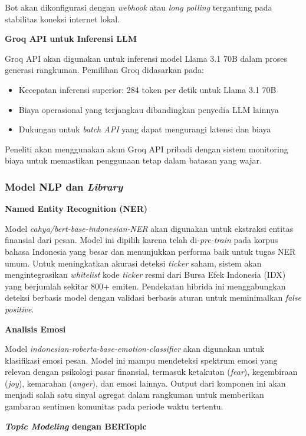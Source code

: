 Bot akan dikonfigurasi dengan \textit{webhook} atau \textit{long polling} tergantung pada stabilitas koneksi internet lokal.

\textbf{Groq API untuk Inferensi LLM}

Groq API akan digunakan untuk inferensi model Llama 3.1 70B dalam proses generasi rangkuman. Pemilihan Groq didasarkan pada:
\begin{itemize}
\item Kecepatan inferensi superior: 284 token per detik untuk Llama 3.1 70B \autocite{groq2024}
\item Biaya operasional yang terjangkau dibandingkan penyedia LLM lainnya
\item Dukungan untuk \textit{batch API} yang dapat mengurangi latensi dan biaya
\end{itemize}

Peneliti akan menggunakan akun Groq API pribadi dengan sistem monitoring biaya untuk memastikan penggunaan tetap dalam batasan yang wajar.

\subsubsection{Model NLP dan \textit{Library}}

\textbf{Named Entity Recognition (NER)}

Model \textit{cahya/bert-base-indonesian-NER} akan digunakan untuk ekstraksi entitas finansial dari pesan. Model ini dipilih karena telah di-\textit{pre-train} pada korpus bahasa Indonesia yang besar dan menunjukkan performa baik untuk tugas NER umum. Untuk meningkatkan akurasi deteksi \textit{ticker} saham, sistem akan mengintegrasikan \textit{whitelist} kode \textit{ticker} resmi dari Bursa Efek Indonesia (IDX) yang berjumlah sekitar 800+ emiten. Pendekatan hibrida ini menggabungkan deteksi berbasis model dengan validasi berbasis aturan untuk meminimalkan \textit{false positive}.

\textbf{Analisis Emosi}

Model \textit{indonesian-roberta-base-emotion-classifier} akan digunakan untuk klasifikasi emosi pesan. Model ini mampu mendeteksi spektrum emosi yang relevan dengan psikologi pasar finansial, termasuk ketakutan (\textit{fear}), kegembiraan (\textit{joy}), kemarahan (\textit{anger}), dan emosi lainnya. Output dari komponen ini akan menjadi salah satu sinyal agregat dalam rangkuman untuk memberikan gambaran sentimen komunitas pada periode waktu tertentu.

\textbf{\textit{Topic Modeling} dengan BERTopic}

